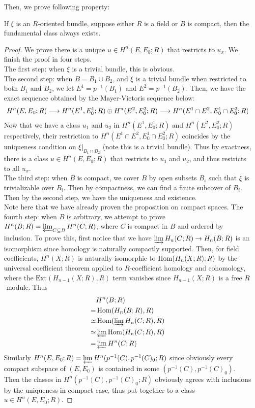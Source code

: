 	Then, we prove following property: 
	\begin{prop} \label{partial_fund_class}
		If $\xi$ is an $R$-oriented bundle, suppose either $R$ is a field or $B$ is compact, then the fundamental class always exists. 
	\end{prop}
	\begin{proof}
		We prove there is a unique $u\in H^n(E,E_0;R)$ that restricts to $u_x$. We finish the proof in four steps. \\
		The first step: when $\xi$ is a trivial bundle, this is obvious. \\
		The second step: when $B=B_1\cup B_2$, and $\xi$ is a trivial bundle when restricted to both $B_1$ and $B_2$, we let $E^1=p^{-1}(B_1)$ and $E^2=p^{-1}(B_2)$. Then, we have the exact sequence obtained by the Mayer-Vietoris sequence below: 
		\[ H^n(E,E_0;R)\longrightarrow H^n(E^1,E_0^1;R)\oplus H^n(E^2,E_0^2;R)\longrightarrow H^n(E^1\cap E^2,E_0^1\cap E_0^2;R) \]
		Now that we have a class $u_1$ and $u_2$ in $H^n(E^1,E_0^1;R)$ and $H^n(E^2,E_0^2;R)$ respectively, their restriction to $H^n(E^1\cap E^2,E_0^1\cap E_0^2;R)$ coincides by the uniqueness condition on $\xi|_{B_1\cap B_2}$ (note this is a trivial bundle). Thus by exactness, there is a class $u\in H^n(E,E_0;R)$ that restricts to $u_1$ and $u_2$, and thus restricts to all $u_x$. \\
		The third step: when $B$ is compact, we cover $B$ by open subsets $B_i$ such that $\xi$ is trivializable over $B_i$. Then by compactness, we can find a finite subcover of $B_i$. Then by the second step, we have the uniqueness and existence. \\
		Note here that we have already proven the proposition on compact spaces. 
		The fourth step: when $B$ is arbitrary, we attempt to prove $H^n(B;R)=\varprojlim_{C\subseteq B} H^n(C;R)$, where $C$ is compact in $B$ and ordered by inclusion. To prove this, first notice that we have $\varinjlim H_n(C;R)\to H_n(B;R)$ is an isomorphism since homology is naturally compactly supported. Then, for field coefficients, $H^n(X;R)$ is naturally isomorphic to $\operatorname{\mathrm{Hom}}(H_n(X;R);R)$ by the universal coefficient theorem applied to $R$-coefficient homology and cohomology, where the $\mathrm{Ext}(H_{n-1}(X;R),R)$ term vanishes since $H_{n-1}(X;R)$ is a free $R$-module. Thus 
		\begin{align*}
			&H^n(B;R) \\
			=&\operatorname{\mathrm{Hom}}(H_n(B;R),R) \\
			\simeq&\operatorname{\mathrm{Hom}}(\varinjlim H_n(C;R),R) \\
			\simeq&\varprojlim\operatorname{\mathrm{Hom}}(H_n(C;R),R) \\
			=&\varprojlim H^n(C;R) \\
		\end{align*}
		Similarly $H^n(E,E_0;R)=\varprojlim H^n(p^{-1}(C),p^{-1}(C)_0;R)$ since obviously every compact subspace of $(E,E_0)$ is contained in some $(p^{-1}(C),p^{-1}(C)_0)$. Then the classes in $H^n(p^{-1}(C),p^{-1}(C)_0;R)$ obviously agrees with inclusions by the uniqueness in compact case, thus put together to a class $u\in H^n(E,E_0;R)$. 
	\end{proof}

